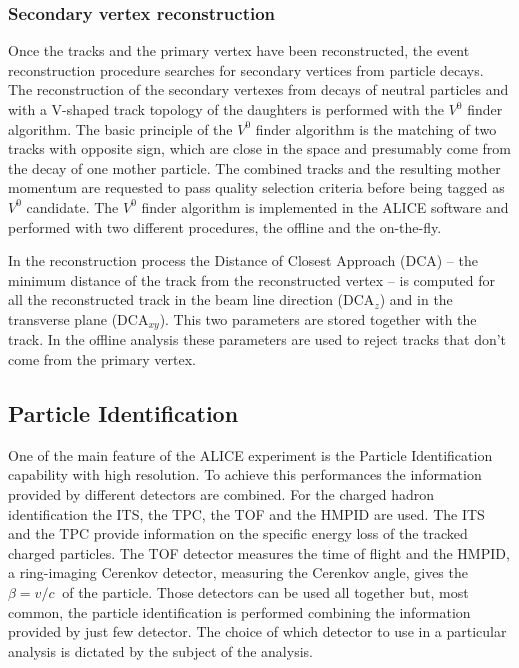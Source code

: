 \subsubsection{Secondary vertex reconstruction}
Once the tracks and the primary vertex have been reconstructed, the event reconstruction procedure
searches for secondary vertices from particle decays.
The reconstruction of the secondary vertexes from decays of neutral particles and with a V-shaped track 
topology of the daughters is performed with the $V^{0}$ finder algorithm.
The basic principle of the $V^{0}$ finder algorithm is the matching of two tracks with opposite sign,
which are close in the space and presumably come from the decay of one mother particle.
The combined tracks and the resulting mother momentum are requested to pass quality selection criteria
before being tagged as $V^{0}$ candidate.
The $V^{0}$ finder algorithm is implemented in the ALICE software and performed with two different
procedures, the offline and the on-the-fly.

In the reconstruction process the Distance of Closest Approach (DCA) -- the minimum 
distance of the track from the reconstructed vertex -- is computed for all the reconstructed
track in the beam line direction (DCA$_{z}$) and in the transverse plane (DCA$_{xy}$).
This two parameters are stored together with the track.
In the offline analysis these parameters are used to reject tracks that don't come from the 
primary vertex.

%
\subsection{Particle Identification} \label{sec:PID}

One of the main feature of the ALICE experiment is the Particle Identification capability with high
resolution. To achieve this performances the information provided by different detectors are combined.
For the charged hadron identification the ITS, the TPC, the TOF and the HMPID are used.
The ITS and the TPC provide information on the specific energy loss of the tracked charged particles.
The TOF detector measures the time of flight and the HMPID, a ring-imaging Cerenkov detector,
measuring the Cerenkov angle, gives the $\beta = v / c\ $ of the particle.
Those detectors can be used all together but, most common, the particle identification is performed
combining the information provided by just few detector.
The choice of which detector to use in a particular analysis is dictated by the subject of the analysis.

